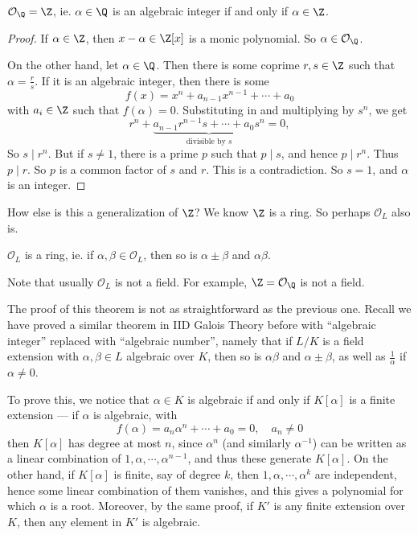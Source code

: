 \documentclass[a4paper]{article}
\begin{document}
\begin{lemma}
  $\mathcal{O}_\Q = \Z$, ie. $\alpha \in \Q$ is an algebraic integer if and only if $\alpha \in \Z$.
\end{lemma}

\begin{proof}
  If $\alpha \in \Z$, then $x - \alpha \in \Z[x]$ is a monic polynomial. So $\alpha \in \mathcal{O}_\Q$.

  On the other hand, let $\alpha \in \Q$. Then there is some coprime $r, s \in \Z$ such that $\alpha = \frac{r}{s}$. If it is an algebraic integer, then there is some
  \[
    f(x) = x^n + a_{n - 1} x^{n - 1} + \cdots + a_0
  \]
  with $a_i \in \Z$ such that $f(\alpha) = 0$. Substituting in and multiplying by $s^n$, we get
  \[
    r^n + \underbrace{a_{n - 1} r^{n - 1}s + \cdots + a_0 s^n}_{\text{divisible by }s} = 0,
  \]
  So $s\mid r^n$. But if $s\not= 1$, there is a prime $p$ such that $p \mid s$, and hence $p \mid r^n$. Thus $p \mid r$. So $p$ is a common factor of $s$ and $r$. This is a contradiction. So $s = 1$, and $\alpha$ is an integer.
\end{proof}

How else is this a generalization of $\Z$? We know $\Z$ is a ring. So perhaps $\mathcal{O}_L$ also is.

\begin{thm}
  $\mathcal{O}_L$ is a ring, ie. if $\alpha, \beta \in \mathcal{O}_L$, then so is $\alpha \pm \beta$ and $\alpha\beta$.
\end{thm}
Note that usually $\mathcal{O}_L$ is not a field. For example, $\Z = \mathcal{O}_\Q$ is not a field.

The proof of this theorem is not as straightforward as the previous one. Recall we have proved a similar theorem in IID Galois Theory before with ``algebraic integer'' replaced with ``algebraic number'', namely that if $L/K$ is a field extension with $\alpha, \beta \in L$ algebraic over $K$, then so is $\alpha\beta$ and $\alpha \pm \beta$, as well as $\frac{1}{\alpha}$ if $\alpha \not= 0$.

To prove this, we notice that $\alpha \in K$ is algebraic if and only if $K[\alpha]$ is a finite extension --- if $\alpha$ is algebraic, with
\[
  f(\alpha) = a_n \alpha^n + \cdots + a_0 = 0,\quad a_n \not= 0
\]
then $K[\alpha]$ has degree at most $n$, since $\alpha^n$ (and similarly $\alpha^{-1}$) can be written as a linear combination of $1, \alpha, \cdots, \alpha^{n - 1}$, and thus these generate $K[\alpha]$. On the other hand, if $K[\alpha]$ is finite, say of degree $k$, then $1, \alpha, \cdots, \alpha^k$ are independent, hence some linear combination of them vanishes, and this gives a polynomial for which $\alpha$ is a root. Moreover, by the same proof, if $K'$ is any finite extension over $K$, then any element in $K'$ is algebraic.
\end{document}

